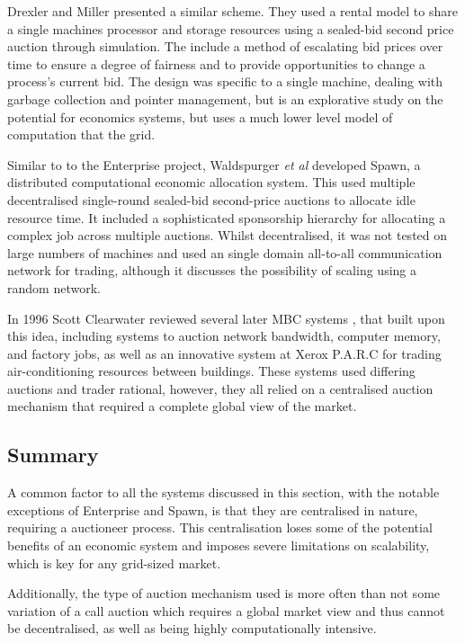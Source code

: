 Drexler and Miller presented a similar scheme\cite{eco-drexler88-crm}. They
used a rental model to share a single machines processor and storage resources
using a sealed-bid second price auction through simulation. The include a
method of escalating bid prices over time to ensure a degree of fairness and to
provide opportunities to change a process's current bid.  The design was
specific to a single machine, dealing with garbage collection and pointer
management, but is an explorative study on the potential for economics systems,
but uses a much lower level model of computation that the grid.

Similar to to the Enterprise project, Waldspurger \textit{et al} developed
Spawn, a distributed computational economic allocation
system\cite{eco-waldspurger92-spawn}. This used multiple decentralised
single-round sealed-bid second-price auctions to allocate idle resource time.
It included a sophisticated sponsorship hierarchy for allocating a complex job
across multiple auctions. Whilst decentralised, it was not tested on large
numbers of machines and used an single domain all-to-all communication network
for trading, although it discusses the possibility of scaling using a random
network.

In 1996 Scott Clearwater reviewed several later MBC systems
\cite{eco-clearwater96-mbc}, that built upon this idea, including systems to
auction network bandwidth, computer memory, and factory jobs, as well as an
innovative system at Xerox P.A.R.C for trading air-conditioning resources
between buildings. These systems used differing auctions and trader
rational, however, they all relied on a centralised auction mechanism that
required a complete global view of the market. 



\subsection{Summary}

A common factor to all the systems discussed in this section, with the notable
exceptions of Enterprise and Spawn, is that they are centralised in nature,
requiring a auctioneer process.  This centralisation loses some of the
potential benefits of an economic system and imposes severe limitations on
scalability, which is key for any grid-sized market.  

Additionally, the type of auction mechanism used is more often than not some
variation of a call auction which requires a global market view and thus cannot
be decentralised, as well as being highly computationally intensive.


